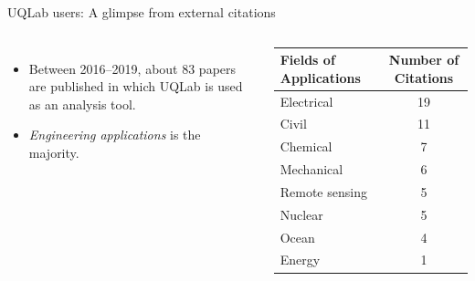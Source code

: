 \documentclass[]{rsuqbeamernew}
\begin{document}
\begin{frame}[t]{UQLab users: A glimpse from external citations}
\begin{columns}
    \begin{itemize}
    \item Between 2016--2019, about 83 papers are published in which UQLab is used as an analysis tool.
    \item \emph{Engineering applications} is the majority.
  \end{itemize}
  \begin{minipage}{\linewidth}
    \begin{tabularx}{\textwidth}{Xc}
      \hline
      \scriptsize{Fields of Applications} & \footnotesize{Number of Citations} \\
      \hline
      \footnotesize{Electrical} & 19  \\
      \footnotesize{Civil} & 11 \\
      \footnotesize{Chemical} & 7 \\
      \footnotesize{Mechanical} & 6 \\
      \footnotesize{Remote sensing} & 5 \\
      \footnotesize{Nuclear} & 5 \\
      \footnotesize{Ocean} & 4 \\
      \footnotesize{Energy} & 1 \\
      \hline
    \end{tabularx}
  \end{minipage}%
  \hfill
\end{columns}

\end{frame}
\end{document}
